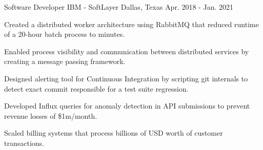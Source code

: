 \begin{cventries}
	\cventry
	{Software Developer}
	{IBM - SoftLayer}
	{Dallas, Texas}
	{Apr. 2018 - Jan. 2021}
	{
		\begin{cvitems}
			\item {Created a distributed worker architecture using RabbitMQ that reduced runtime of a 20-hour batch process to minutes.}
			\item {Enabled process visibility and communication between distributed services by creating a message passing framework.}
			\item {Designed alerting tool for Continuous Integration by scripting git internals to detect exact commit responsible for a test suite regression.}
			\item {Developed Influx queries for anomaly detection in API submissions to prevent revenue losses of \$1m/month.}
			\item {Scaled billing systems that process billions of USD worth of customer transactions.}
		\end{cvitems}
	}
	
%	


\end{cventries}

